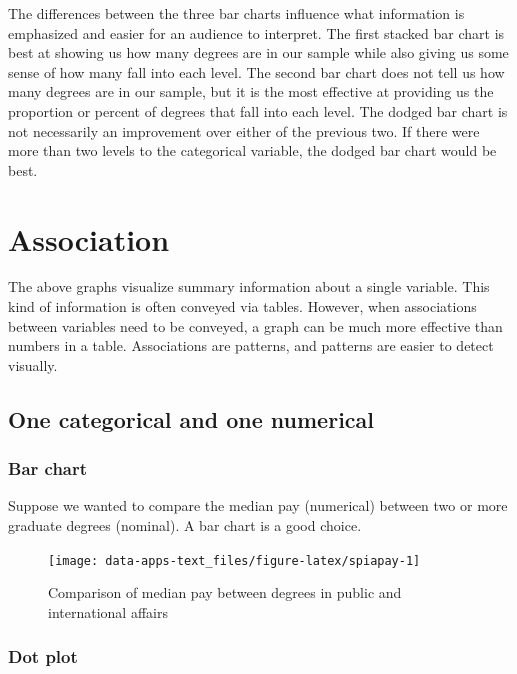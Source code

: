 \documentclass[
]{book}
\begin{document}
The differences between the three bar charts influence what information is emphasized and easier for an audience to interpret. The first stacked bar chart is best at showing us how many degrees are in our sample while also giving us some sense of how many fall into each level. The second bar chart does not tell us how many degrees are in our sample, but it is the most effective at providing us the proportion or percent of degrees that fall into each level. The dodged bar chart is not necessarily an improvement over either of the previous two. If there were more than two levels to the categorical variable, the dodged bar chart would be best.

\hypertarget{association}{%
\section{Association}\label{association}}

The above graphs visualize summary information about a single variable. This kind of information is often conveyed via tables. However, when associations between variables need to be conveyed, a graph can be much more effective than numbers in a table. Associations are patterns, and patterns are easier to detect visually.

\hypertarget{one-categorical-and-one-numerical}{%
\subsection{One categorical and one numerical}\label{one-categorical-and-one-numerical}}

\hypertarget{bar-chart-1}{%
\subsubsection{Bar chart}\label{bar-chart-1}}

Suppose we wanted to compare the median pay (numerical) between two or more graduate degrees (nominal). A bar chart is a good choice.

\begin{figure}

{\centering \texttt{[image: data-apps-text\_files/figure-latex/spiapay-1]} 

}

\caption{Comparison of median pay between degrees in public and international affairs}\label{fig:spiapay}
\end{figure}

\hypertarget{dot-plot}{%
\subsubsection{Dot plot}\label{dot-plot}}
\end{document}
